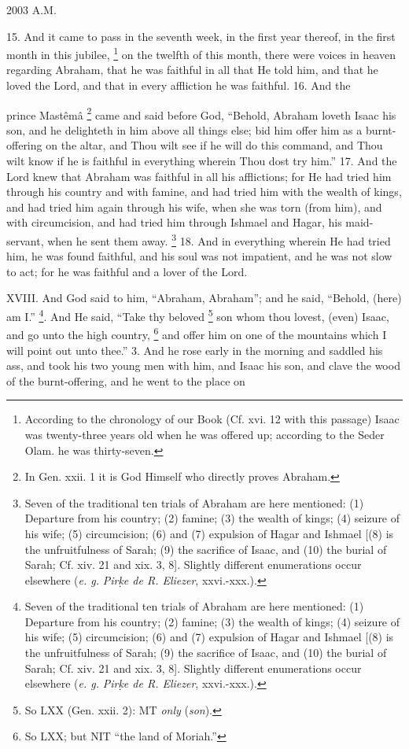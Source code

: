 
2003 A.M.

15. And it came to pass in the seventh week, in the first year thereof, in the first month in this jubilee, \footnote{According to the chronology of our Book (Cf. xvi. 12 with this passage) Isaac was twenty-three years old when he was offered up; according to the Seder Olam. he was thirty-seven.} on the twelfth of this month, there were voices in heaven regarding Abraham, that he was faithful in all that He told him, and that he loved the Lord, and that in every affliction he was faithful. 16. And the

prince Mastêmâ \footnote{In Gen. xxii. 1 it is God Himself who directly proves Abraham.} came and said before God, ``Behold, Abraham loveth Isaac his son, and he delighteth in him above all things else; bid him offer him as a burnt-offering on the altar, and Thou wilt see if he will do this command, and Thou wilt know if he is faithful in everything wherein Thou dost try him.'' 17. And the Lord knew that Abraham was faithful in all his afflictions; for He had tried him through his country and with famine, and had tried him with the wealth of kings, and had tried him again through his wife, when she was torn (from him), and with circumcision, and had tried him through Ishmael and Hagar, his maid-servant, when he sent them away. \footnote{Seven of the traditional ten trials of Abraham are here mentioned: (1) Departure from his country; (2) famine; (3) the wealth of kings; (4) seizure of his wife; (5) circumcision; (6) and (7) expulsion of Hagar and Ishmael [(8) is the unfruitfulness of Sarah; (9) the sacrifice of Isaac, and (10) the burial of Sarah; Cf. xiv. 21 and xix. 3, 8]. Slightly different enumerations occur elsewhere (\emph{e. g.} \emph{Pir\d{k}e de R. Eliezer}, xxvi.-xxx.).} 18. And in everything wherein He had tried him, he was found faithful, and his soul was not impatient, and he was not slow to act; for he was faithful and a lover of the Lord.


XVIII. And God said to him, ``Abraham, Abraham''; and he said, ``Behold, (here) am I.'' \footnote{Seven of the traditional ten trials of Abraham are here mentioned: (1) Departure from his country; (2) famine; (3) the wealth of kings; (4) seizure of his wife; (5) circumcision; (6) and (7) expulsion of Hagar and Ishmael [(8) is the unfruitfulness of Sarah; (9) the sacrifice of Isaac, and (10) the burial of Sarah; Cf. xiv. 21 and xix. 3, 8]. Slightly different enumerations occur elsewhere (\emph{e. g.} \emph{Pir\d{k}e de R. Eliezer}, xxvi.-xxx.).}. And He said, ``Take thy beloved \footnote{So LXX (Gen. xxii. 2): MT \emph{only} (\emph{son}).} son whom thou lovest, (even) Isaac, and go unto the high country, \footnote{So LXX; but NIT ``the land of Moriah.''} and offer him on one of the mountains which I will point out unto thee.'' 3. And he rose early in the morning and saddled his ass, and took his two young men with him, and Isaac his son, and clave the wood of the burnt-offering, and he went to the place on

